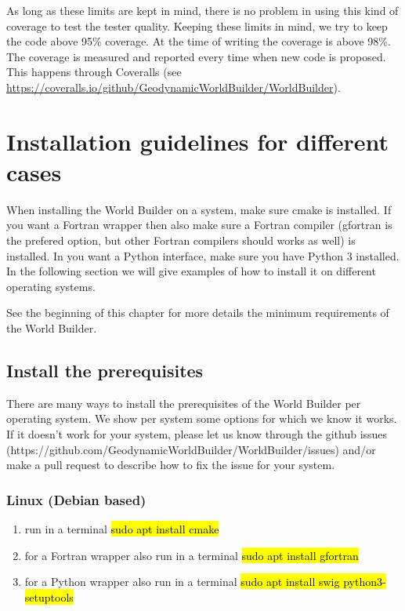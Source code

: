 \documentclass{book}
\newcommand{\WB}{{World Builder}}
\newcommand{\cmake}{{cmake}}
\begin{document}
As long as these limits are kept in mind, there is no problem in using this kind of coverage to test the tester quality. Keeping these limits in mind, we try to keep the code above 95\% coverage. At the time of writing the coverage is above 98\%. The coverage is measured and reported every time when new code is proposed. This happens through Coveralls (see \url{https://coveralls.io/github/GeodynamicWorldBuilder/WorldBuilder}).


\section{Installation guidelines for different cases}
\label{section:installation_for_different_cases}
When installing the \WB{} on a system, make sure \cmake{} is installed. If you want a Fortran wrapper then also make sure a Fortran compiler (gfortran is the prefered option, but other Fortran compilers should works as well) is installed. In you want a Python interface, make sure you have Python 3 installed. In the following section we will give examples of how to install it on different operating systems.
\begin{remark}
See the beginning of this chapter for more details the minimum requirements of the \WB{}.
\end{remark}

\subsection{Install the prerequisites}
There are many ways to install the prerequisites of the \WB{} per operating system. We show per system some options for which we know it works. If it doesn't work for your system, please let us know through the github issues (https://github.com/GeodynamicWorldBuilder/WorldBuilder/issues) and/or make a pull request to describe how to fix the issue for your system.
\subsubsection{Linux (Debian based)}
\begin{enumerate}
    \item run in a terminal \hl{sudo apt install cmake}
    \item for a Fortran wrapper also run in a terminal \hl{sudo apt install gfortran}
    \item for a Python wrapper also run in a terminal \hl{sudo apt install swig python3-setuptools}
\end{enumerate}
\end{document}

